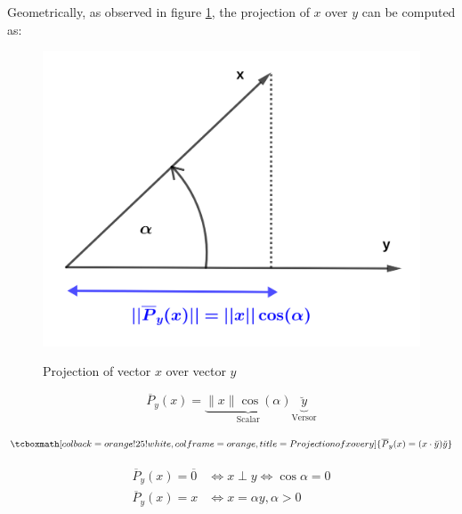 \documentclass{article}
\begin{document}
Geometrically, as observed in figure \ref{fig:projection}, the projection of $x$ over $y$ can be computed as:

\begin{figure}[ht]
\caption{Projection of vector $x$ over vector $y$}
\includegraphics[scale=1]{../../common/img/rn/projection.png} 
\centering
\label{fig:projection}
\end{figure}

\begin{equation}
\overline{P}_{y}(x) =  \underbrace{ \|x\| \cos(\alpha) }_{\text{Scalar}}  \underbrace{ \breve{y} }_{\text{Versor}}
\end{equation}

\begin{equation}
\tcboxmath[colback=orange!25!white,colframe=orange, title=Projection of x over y]
{ \overline{P}_{y}(x) = (x \cdot \breve{y}) \breve{y} }
\end{equation}

\begin{subequations}
\begin{align}
\overline{P}_{y}(x) = \overline{0} & \Longleftrightarrow x \perp y \Longleftrightarrow \cos \alpha = 0 \\
\overline{P}_{y}(x) = x & \Longleftrightarrow x = \alpha y, \alpha > 0
\end{align}
\end{subequations}
\end{document}
